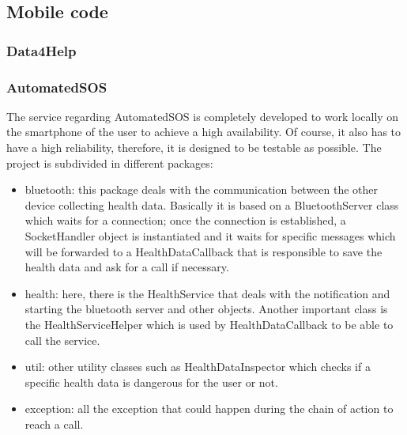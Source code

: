 \subsection{Mobile code}

\subsubsection{Data4Help}

\subsubsection{AutomatedSOS}
The service regarding AutomatedSOS is completely developed to work locally on the smartphone of the user to achieve a high availability. Of course, it also has to have a high reliability, therefore, it is designed to be testable as possible. The project is subdivided in different packages:
\begin{itemize}
	\item bluetooth: this package deals with the communication between the other device collecting health data. Basically it is based on a BluetoothServer class which waits for a connection; once the connection is established, a SocketHandler object is instantiated and it waits for specific messages which will be forwarded to a HealthDataCallback that is responsible to save the health data and ask for a call if necessary.
	\item health: here, there is the HealthService that deals with the notification and starting the bluetooth server and other objects. Another important class is the HealthServiceHelper which is used by HealthDataCallback to be able to call the service.
	\item util: other utility classes such as HealthDataInspector which checks if a specific health data is dangerous for the user or not.
	\item exception: all the exception that could happen during the chain of action to reach a call.
\end{itemize}


